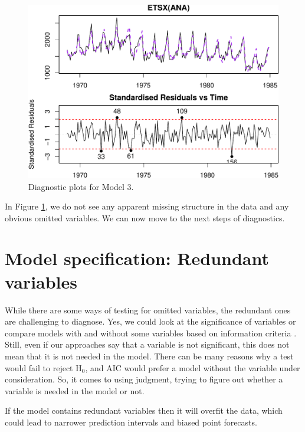 \documentclass[]{book}
\theoremstyle{definition}
\theoremstyle{definition}
\theoremstyle{definition}
\theoremstyle{definition}
\theoremstyle{remark}
\begin{document}
\begin{figure}
\centering
\includegraphics{Svetunkov--2022----ADAM_files/figure-latex/adamSeat03-1.pdf}
\caption{\label{fig:adamSeat03}Diagnostic plots for Model 3.}
\end{figure}

In Figure \ref{fig:adamSeat03}, we do not see any apparent missing structure in the data and any obvious omitted variables. We can now move to the next steps of diagnostics.

\hypertarget{diagnosticsRedundant}{%
\section{Model specification: Redundant variables}\label{diagnosticsRedundant}}

While there are some ways of testing for omitted variables, the redundant ones are challenging to diagnose. Yes, we could look at the significance of variables \citep[Section 5.3 of][]{SvetunkovSBA} or compare models with and without some variables based on information criteria \citep[Section 13.4 of][]{SvetunkovSBA}. Still, even if our approaches say that a variable is not significant, this does not mean that it is not needed in the model. There can be many reasons why a test would fail to reject H\(_0\), and AIC would prefer a model without the variable under consideration. So, it comes to using judgment, trying to figure out whether a variable is needed in the model or not.

If the model contains redundant variables then it will overfit the data, which could lead to narrower prediction intervals and biased point forecasts.
\end{document}
